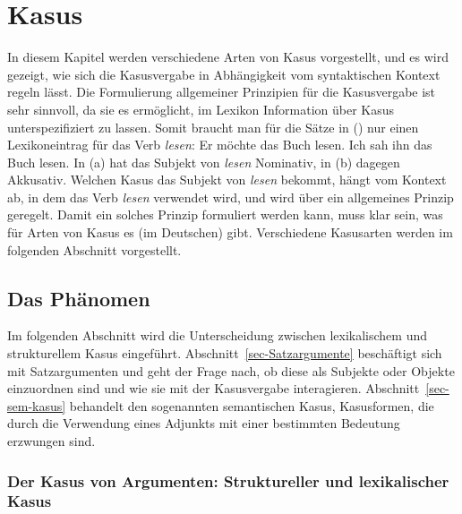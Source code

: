 


\chapter{Kasus}
\label{Kapitel-Kasus}

In diesem Kapitel werden verschiedene Arten von Kasus vorgestellt, und es wird gezeigt,
wie sich die Kasusvergabe in Abhängigkeit vom syntaktischen Kontext regeln lässt.
Die Formulierung allgemeiner Prinzipien für die Kasusvergabe ist sehr sinnvoll,
da sie es ermöglicht, im Lexikon Information über Kasus unterspezifiziert zu lassen.
Somit braucht man für die Sätze in () nur einen Lexikoneintrag für das Verb \emph{lesen}:
\eal
\ex Er möchte das Buch lesen.
\ex Ich sah ihn das Buch lesen.
\zl
In (a) hat das Subjekt von \emph{lesen} Nominativ, in (b) dagegen Akkusativ.
Welchen Kasus das Subjekt von \emph{lesen} bekommt, hängt vom Kontext ab, in dem das
Verb \emph{lesen} verwendet wird, und wird über ein allgemeines Prinzip geregelt. Damit
ein solches Prinzip formuliert werden kann, muss klar sein, was für Arten von Kasus es
(im Deutschen) gibt. Verschiedene Kasusarten werden im folgenden Abschnitt vorgestellt.

\section{Das Phänomen}

Im folgenden Abschnitt wird die Unterscheidung zwischen lexikalischem und strukturellem
Kasus eingeführt. Abschnitt~\ref{sec-Satzargumente} beschäftigt sich mit Satzargumenten und geht der Frage nach, ob
diese als Subjekte oder Objekte einzuordnen sind und wie sie mit der Kasusvergabe
interagieren. Abschnitt~\ref{sec-sem-kasus} behandelt den sogenannten
semantischen Kasus, \dash Kasusformen, die durch die Verwendung eines Adjunkts
mit einer bestimmten Bedeutung erzwungen sind. 

\subsection{Der Kasus von Argumenten: Struktureller und lexikalischer Kasus}
\label{sec-struk-lex-kas}
\label{sec-struc-lex-kas}
%

